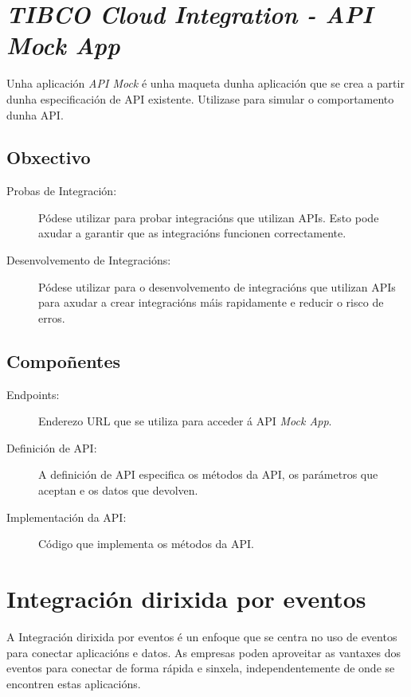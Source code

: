 \section{\textit{TIBCO Cloud Integration - API Mock App}}

Unha aplicación \textit{API Mock} é unha maqueta dunha aplicación que se crea a partir dunha especificación de API existente. Utilizase para simular o comportamento dunha API. 

\subsection{Obxectivo}

\begin{description}
    \item[Probas de Integración:] Pódese utilizar para probar integracións que utilizan APIs. Esto pode axudar a garantir que as integracións funcionen correctamente.
    \item[Desenvolvemento de Integracións:] Pódese utilizar para o desenvolvemento de integracións que utilizan APIs para axudar a crear integracións máis rapidamente e reducir o risco de erros.
\end{description}

\subsection{Compoñentes}

\begin{description}
    \item[Endpoints:] Enderezo URL que se utiliza para acceder á API \textit{Mock App}.
    \item[Definición de API:] A definición de API especifica os métodos da API, os parámetros que aceptan e os datos que devolven.
    \item[Implementación da API:] Código que implementa os métodos da API.
\end{description}

\section{Integración dirixida por eventos}

A Integración dirixida por eventos é un enfoque que se centra no uso de eventos para conectar aplicacións e datos. As empresas poden aproveitar as vantaxes dos eventos para conectar de forma rápida e sinxela, independentemente de onde se encontren estas aplicacións.

